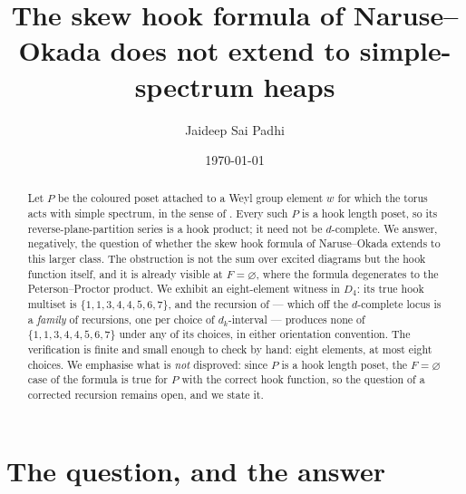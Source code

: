 \documentclass[reqno]{amsart}
\theoremstyle{plain}
\theoremstyle{definition}
\newcommand{\dk}{d_k}
\begin{document}
\title{The skew hook formula of Naruse--Okada does not extend to
simple-spectrum heaps}

\author{Jaideep Sai Padhi}
\address{Department of Computer Science, Purdue University}

\date{\today}

\begin{abstract}
Let $P$ be the coloured poset attached to a Weyl group element $w$ for which
the torus acts with simple spectrum, in the sense of
\cite[\S5.4.2]{DKK}.  Every such $P$ is a hook length poset, so its
reverse-plane-partition series is a hook product; it need not be $d$-complete.
We answer, negatively, the question of whether the skew hook formula of
Naruse--Okada \cite[Thm.~1.2]{NO} extends to this larger class.  The
obstruction is not the sum over excited diagrams but the hook function itself,
and it is already visible at $F=\varnothing$, where the formula degenerates to
the Peterson--Proctor product.  We exhibit an eight-element witness in $D_4$:
its true hook multiset is $\{1,1,3,4,4,5,6,7\}$, and the recursion of
\cite[Def.~2.6]{NO} --- which off the $d$-complete locus is a \emph{family} of
recursions, one per choice of $\dk$-interval --- produces none of
$\{1,1,3,4,4,5,6,7\}$ under any of its choices, in either orientation
convention.  The verification is finite and small enough to check by hand:
eight elements, at most eight choices.  We emphasise what is \emph{not}
disproved: since $P$ is a hook length poset, the $F=\varnothing$ case of the
formula is true for $P$ with the correct hook function, so the question of a
corrected recursion remains open, and we state it.
\end{abstract}

\maketitle

\section{The question, and the answer}
\end{document}

